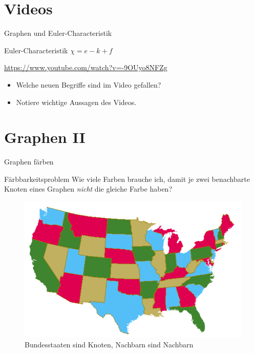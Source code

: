 \documentclass[18pt]{beamer}
\begin{document}
\section{Videos}
    \begin{frame}{Graphen und Euler-Characteristik}
        \begin{block}{Euler-Characteristik}
            \pause
            $\chi = e - k + f$
        \end{block}

        \url{https://www.youtube.com/watch?v=-9OUyo8NFZg}

        \begin{itemize}
            \item Welche neuen Begriffe sind im Video gefallen?
            \item Notiere wichtige Aussagen des Videos.
        \end{itemize}
    \end{frame}

\section{Graphen II}

    \begin{frame}{Graphen färben}
        \begin{block}{Färbbarkeitsproblem}
            Wie viele Farben brauche ich, damit je zwei benachbarte Knoten
            eines Graphen \emph{nicht} die gleiche Farbe haben?
        \end{block}
        \pause
        \begin{figure}[]
            \centering
            \includegraphics[keepaspectratio, width=.5\textwidth]{figures/usa.png}
            \caption{Bundesstaaten sind Knoten, Nachbarn sind Nachbarn}
        \end{figure}
    \end{frame}
\end{document}
